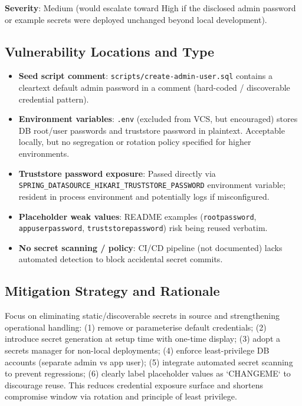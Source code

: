 \documentclass[]{UCD_CS_FYP_Report}
\begin{document}
	\textbf{Severity}: Medium (would escalate toward High if the disclosed admin password or example secrets were deployed unchanged beyond local development).

\subsection*{Vulnerability Locations and Type}
\begin{itemize}
		\item \textbf{Seed script comment}: \texttt{scripts/create-admin-user.sql} contains a cleartext default admin password in a comment (hard-coded / discoverable credential pattern).
		\item \textbf{Environment variables}: \texttt{.env} (excluded from VCS, but encouraged) stores DB root/user passwords and truststore password in plaintext. Acceptable locally, but no segregation or rotation policy specified for higher environments.
		\item \textbf{Truststore password exposure}: Passed directly via \texttt{SPRING\_DATASOURCE\_HIKARI\_TRUSTSTORE\_PASSWORD} environment variable; resident in process environment and potentially logs if misconfigured.
		\item \textbf{Placeholder weak values}: README examples (\texttt{rootpassword}, \texttt{appuserpassword}, \texttt{truststorepassword}) risk being reused verbatim.
	\item \textbf{No secret scanning / policy}: CI/CD pipeline (not documented) lacks automated detection to block accidental secret commits.
\end{itemize}

\subsection*{Mitigation Strategy and Rationale}
Focus on eliminating static/discoverable secrets in source and strengthening operational handling: (1) remove or parameterise default credentials; (2) introduce secret generation at setup time with one-time display; (3) adopt a secrets manager for non-local deployments; (4) enforce least-privilege DB accounts (separate admin vs app user); (5) integrate automated secret scanning to prevent regressions; (6) clearly label placeholder values as `CHANGEME` to discourage reuse. This reduces credential exposure surface and shortens compromise window via rotation and principle of least privilege.
\end{document}
